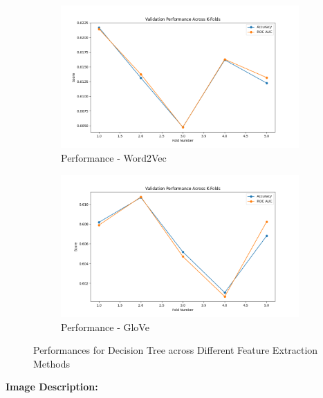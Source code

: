 \begin{figure}[H]
    \begin{subfigure}[b]{0.48\textwidth}
        \includegraphics[width=\textwidth]{img/report_info/img/1.2.DecisionTree/best_decision_tree_word2vec.png}
        \caption{Performance - Word2Vec}
        \label{fig:lr-word2vec}
    \end{subfigure}
    \begin{subfigure}[b]{0.48\textwidth}
        \includegraphics[width=\textwidth]{img/report_info/img/1.2.DecisionTree/best_decision_tree_glove.png}
        \caption{Performance - GloVe}
        \label{fig:lr-glove}
    \end{subfigure}
    
    \caption{Performances for Decision Tree across Different Feature Extraction Methods}
    \label{fig:lr-performance-group}
\end{figure}

\textbf{Image Description:}

